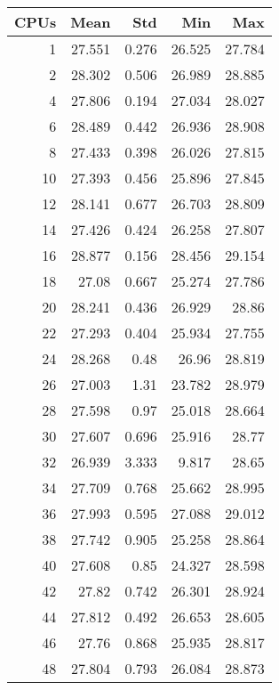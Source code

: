 \begin{table}[htbp]
  \centering
  \begin{minipage}{.45\textwidth}
    \centering
    \scriptsize
\begin{tabular}{rrrrr}
\toprule
\textbf{CPUs} & \textbf{Mean} & \textbf{Std} & \textbf{Min} & \textbf{Max} \\
\midrule
1 & 27.551 & 0.276 & 26.525 & 27.784 \\
2 & 28.302 & 0.506 & 26.989 & 28.885 \\
4 & 27.806 & 0.194 & 27.034 & 28.027 \\
6 & 28.489 & 0.442 & 26.936 & 28.908 \\
8 & 27.433 & 0.398 & 26.026 & 27.815 \\
10 & 27.393 & 0.456 & 25.896 & 27.845 \\
12 & 28.141 & 0.677 & 26.703 & 28.809 \\
14 & 27.426 & 0.424 & 26.258 & 27.807 \\
16 & 28.877 & 0.156 & 28.456 & 29.154 \\
18 & 27.08 & 0.667 & 25.274 & 27.786 \\
20 & 28.241 & 0.436 & 26.929 & 28.86 \\
22 & 27.293 & 0.404 & 25.934 & 27.755 \\
24 & 28.268 & 0.48 & 26.96 & 28.819 \\
26 & 27.003 & 1.31 & 23.782 & 28.979 \\
28 & 27.598 & 0.97 & 25.018 & 28.664 \\
30 & 27.607 & 0.696 & 25.916 & 28.77 \\
32 & 26.939 & 3.333 & 9.817 & 28.65 \\
34 & 27.709 & 0.768 & 25.662 & 28.995 \\
36 & 27.993 & 0.595 & 27.088 & 29.012 \\
38 & 27.742 & 0.905 & 25.258 & 28.864 \\
40 & 27.608 & 0.85 & 24.327 & 28.598 \\
42 & 27.82 & 0.742 & 26.301 & 28.924 \\
44 & 27.812 & 0.492 & 26.653 & 28.605 \\
46 & 27.76 & 0.868 & 25.935 & 28.817 \\
48 & 27.804 & 0.793 & 26.084 & 28.873 \\
\bottomrule
\end{tabular}


\end{minipage}
\end{table}
